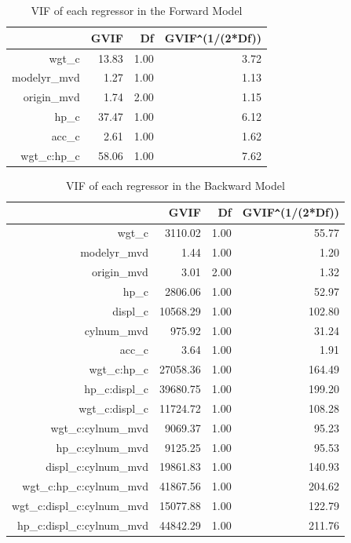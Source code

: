 \documentclass{article}
\begin{document}
\clearpage
\newpage 

\begin{table}[ht]
\centering
\begin{tabular}{rrrr}
  \hline
 & GVIF & Df & GVIF\verb|^|(1/(2*Df)) \\ 
  \hline
wgt\_c & 13.83 & 1.00 & 3.72 \\ 
  modelyr\_mvd & 1.27 & 1.00 & 1.13 \\ 
  origin\_mvd & 1.74 & 2.00 & 1.15 \\ 
  hp\_c & 37.47 & 1.00 & 6.12 \\ 
  acc\_c & 2.61 & 1.00 & 1.62 \\ 
  wgt\_c:hp\_c & 58.06 & 1.00 & 7.62 \\ 
   \hline
\end{tabular}
\caption{VIF of each regressor in the Forward Model}
\label{tab:forwardmodelvif}
\end{table}

\begin{table}[ht]
\centering
\begin{tabular}{rrrr}
  \hline
 & GVIF & Df & GVIF\verb|^|(1/(2*Df)) \\ 
  \hline
wgt\_c & 3110.02 & 1.00 & 55.77 \\ 
  modelyr\_mvd & 1.44 & 1.00 & 1.20 \\ 
  origin\_mvd & 3.01 & 2.00 & 1.32 \\ 
  hp\_c & 2806.06 & 1.00 & 52.97 \\ 
  displ\_c & 10568.29 & 1.00 & 102.80 \\ 
  cylnum\_mvd & 975.92 & 1.00 & 31.24 \\ 
  acc\_c & 3.64 & 1.00 & 1.91 \\ 
  wgt\_c:hp\_c & 27058.36 & 1.00 & 164.49 \\ 
  hp\_c:displ\_c & 39680.75 & 1.00 & 199.20 \\ 
  wgt\_c:displ\_c & 11724.72 & 1.00 & 108.28 \\ 
  wgt\_c:cylnum\_mvd & 9069.37 & 1.00 & 95.23 \\ 
  hp\_c:cylnum\_mvd & 9125.25 & 1.00 & 95.53 \\ 
  displ\_c:cylnum\_mvd & 19861.83 & 1.00 & 140.93 \\ 
  wgt\_c:hp\_c:cylnum\_mvd & 41867.56 & 1.00 & 204.62 \\ 
  wgt\_c:displ\_c:cylnum\_mvd & 15077.88 & 1.00 & 122.79 \\ 
  hp\_c:displ\_c:cylnum\_mvd & 44842.29 & 1.00 & 211.76 \\ 
   \hline
\end{tabular}
\caption{VIF of each regressor in the Backward Model}
\label{tab:backwardmodelvif}
\end{table}
\end{document}

